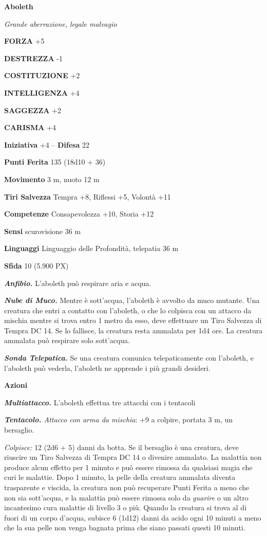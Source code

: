 \begin{multicols}{2}

\medskip{}\textbf{Aboleth}

\textit{Grande aberrazione, legale malvagio}

\textbf{FORZA} +5

\textbf{DESTREZZA} -1

\textbf{COSTITUZIONE} +2

\textbf{INTELLIGENZA} +4

\textbf{SAGGEZZA} +2

\textbf{CARISMA} +4

\textbf{Iniziativa} +4 -- \textbf{Difesa} 22

\textbf{Punti Ferita} 135 (18d10 + 36)

\textbf{Movimento} 3 m, nuoto 12 m

\textbf{Tiri Salvezza} Tempra +8, Riflessi +5, Volontà +11

\textbf{Competenze} Consapevolezza +10, Storia +12

\textbf{Sensi} scurovisione 36 m

\textbf{Linguaggi} Linguaggio delle Profondità, telepatia 36 m

\textbf{Sfida} 10 (5.900 PX)

\textit{\textbf{Anfibio.}} L'aboleth può respirare aria e acqua.

\textit{\textbf{Nube di Muco.}} Mentre è sott'acqua, l'aboleth è avvolto da muco mutante. Una creatura che entri a contatto con l'aboleth, o che lo colpisca con un attacco da mischia mentre si trova entro 1 metro da esso, deve effettuare un Tiro Salvezza di Tempra DC 14. Se lo fallisce, la creatura resta ammalata per 1d4 ore. La creatura ammalata può respirare solo sott'acqua.

\textit{\textbf{Sonda Telepatica.}} Se una creatura comunica telepaticamente con l'aboleth, e l'aboleth può vederla, l'aboleth ne apprende i più grandi desideri.

\textbf{Azioni}

\textit{\textbf{Multiattacco.}} L'aboleth effettua tre attacchi con i tentacoli

\textit{\textbf{Tentacolo.} Attacco con arma da mischia}: +9 a colpire, portata 3 m, un bersaglio.

\textit{Colpisce:} 12 (2d6 + 5) danni da botta. Se il bersaglio è una creatura, deve riuscire un Tiro Salvezza di Tempra DC 14 o divenire ammalato. La malattia non produce alcun effetto per 1 minuto e può essere rimossa da qualsiasi magia che curi le malattie. Dopo 1 minuto, la pelle della creatura ammalata diventa trasparente e viscida, la creatura non può recuperare Punti Ferita a meno che non sia sott'acqua, e la malattia può essere rimossa solo da \textit{guarire} o un altro incantesimo cura malattie di livello 3 o più. Quando la creatura si trova al di fuori di un corpo d'acqua, subisce 6 (1d12) danni da acido ogni 10 minuti a meno che la sua pelle non venga bagnata prima che siano passati questi 10 minuti.


\end{multicols}
